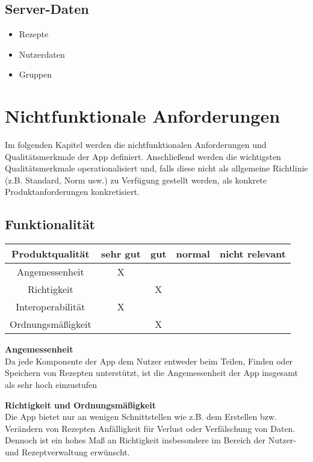 \documentclass[parskip=full]{scrartcl}
\newcommand{\changelocaltocdepth}[1]{%
  \addtocontents{toc}{\protect\setcounter{tocdepth}{#1}}%
  \setcounter{tocdepth}{#1}%
}
\newcommand{\resetsubsectionnumbering}{
    \renewcommand{\thesubsection}{\arabic{section}.\arabic{subsection}}
    \changelocaltocdepth{3} 
}
\begin{document}
\subsection{Server-Daten}
\begin{itemize}
    \item Rezepte
    \item Nutzerdaten
    \item Gruppen
\end{itemize}

\resetsubsectionnumbering
\section{Nichtfunktionale Anforderungen}
Im folgenden Kapitel werden die nichtfunktionalen Anforderungen und Qualitätsmerkmale der App definiert.
Anschließend werden die wichtigsten Qualitätsmerkmale operationalisiert und, falls diese nicht als allgemeine Richtlinie (z.B. Standard, Norm usw.) zu Verfügung gestellt werden,
als konkrete Produktanforderungen konkretisiert.

\subsection{Funktionalität}
\begin{tabular}{| c | c | c | c | c |}
    \hline
    \textbf{ Produktqualität } & \textbf{sehr gut} & \textbf{gut} & \textbf{normal} & \textbf{nicht relevant} \\ \hline
    Angemessenheit             & X                 &              &                 &                         \\ \hline
    Richtigkeit                &                   & X            &                 &                         \\ \hline
    Interoperabilität          & X                 &              &                 &                         \\ \hline
    Ordnungsmäßigkeit          &                   & X            &                 &                         \\ \hline
\end{tabular}

\textbf{Angemessenheit}\\
Da jede Komponente der App dem Nutzer entweder beim Teilen, Finden oder Speichern von Rezepten unterstützt, ist die Angemessenheit der App insgesamt als sehr hoch einzustufen

\textbf{Richtigkeit und Ordnungsmäßigkeit}\\
Die App bietet nur an wenigen Schnittstellen wie z.B. dem Erstellen bzw. Verändern von Rezepten Anfälligkeit für Verlust oder Verfälschung von Daten. Dennoch ist ein hohes Maß an Richtigkeit insbesondere im Bereich der Nutzer- und Rezeptverwaltung erwünscht.
\end{document}
